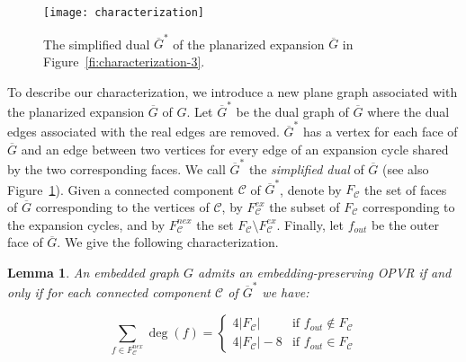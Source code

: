 \documentclass{article}
\newtheorem{lemma}{Lemma}
\newcommand{\C}{\mathcal C}
\newcommand{\opvr}{OPVR\xspace}
\newcommand{\bG}{\overline{G}}
\begin{document}
\begin{figure}[tb]
    \centering
    	\centering
    	\texttt{[image: characterization]}
    \caption{The simplified dual $\bG^*$ of the planarized expansion $\bG$ in Figure~\ref{fi:characterization-3}.\label{fi:characterization-4}}
\end{figure}

To describe our characterization, we introduce a new plane graph associated with the planarized expansion $\bG$ of $G$. Let $\bG^*$ be the dual graph of $\bG$ where the dual edges associated with the real edges are removed. $\bG^*$  has a vertex for each face of $\bG$ and an edge between two vertices for every edge of an expansion cycle shared by the two corresponding faces. We call $\bG^*$ the \emph{simplified dual} of $\bG$ (see also Figure~\ref{fi:characterization-4}). Given a connected component $\C$ of $\bG^*$, denote by $F_{\C}$ the set of faces of $\bG$ corresponding to the vertices of $\C$, by $F_{\C}^{ex}$ the subset of $F_{\C}$ corresponding to the expansion cycles, and by $F_{\C}^{nex}$ the set $F_{\C} \setminus F_{\C}^{ex}$. Finally, let $f_{out}$ be the outer face of $\bG$. We give the following characterization.

\begin{lemma}\label{le:characterization} 
An embedded graph $G$ admits an embedding-preserving \opvr if and only if for each connected component $\C$ of $\bG^*$ we have:

\begin{equation}\label{eq:char}
\sum_{f \in F_{\C}^{nex}}\deg(f)=
    \begin{cases}
    4|F_\C| & \text{if $f_{out} \not \in F_\C$} \\
    4|F_\C|-8 & \text{if $f_{out} \in F_\C$}
    \end{cases}
\end{equation}
\end{lemma}
\end{document}
